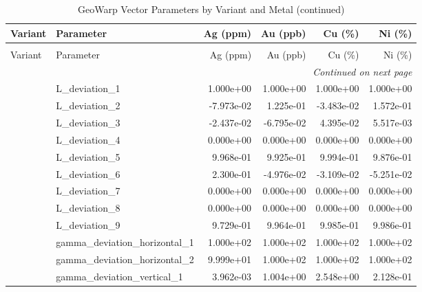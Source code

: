 
\begin{longtable}{llrrrr}
\caption{GeoWarp Vector Parameters by Variant and Metal\label{tab:gw_params}}\\
\toprule
Variant & Parameter & Ag (ppm) & Au (ppb) & Cu (\%) & Ni (\%)\\
\midrule
\endfirsthead

\caption[]{GeoWarp Vector Parameters by Variant and Metal (continued)}\\
\toprule
Variant & Parameter & Ag (ppm) & Au (ppb) & Cu (\%) & Ni (\%)\\
\midrule
\endhead

\midrule
\multicolumn{6}{r}{\textit{Continued on next page}}\\
\endfoot

\bottomrule
\endlastfoot
\multirow{46}{*}{GeoWarp DepthDeform} & L_deviation_1                  & 1.000e+00 & 1.000e+00 & 1.000e+00 & 1.000e+00\\
                               & L_deviation_2                  & -7.973e-02 & 1.225e-01 & -3.483e-02 & 1.572e-01\\
                               & L_deviation_3                  & -2.437e-02 & -6.795e-02 & 4.395e-02 & 5.517e-03\\
                               & L_deviation_4                  & 0.000e+00 & 0.000e+00 & 0.000e+00 & 0.000e+00\\
                               & L_deviation_5                  & 9.968e-01 & 9.925e-01 & 9.994e-01 & 9.876e-01\\
                               & L_deviation_6                  & 2.300e-01 & -4.976e-02 & -3.109e-02 & -5.251e-02\\
                               & L_deviation_7                  & 0.000e+00 & 0.000e+00 & 0.000e+00 & 0.000e+00\\
                               & L_deviation_8                  & 0.000e+00 & 0.000e+00 & 0.000e+00 & 0.000e+00\\
                               & L_deviation_9                  & 9.729e-01 & 9.964e-01 & 9.985e-01 & 9.986e-01\\
                               & gamma_deviation_horizontal_1   & 1.000e+02 & 1.000e+02 & 1.000e+02 & 1.000e+02\\
                               & gamma_deviation_horizontal_2   & 9.999e+01 & 1.000e+02 & 1.000e+02 & 1.000e+02\\
                               & gamma_deviation_vertical_1     & 3.962e-03 & 1.004e+00 & 2.548e+00 & 2.128e-01\\

\end{longtable}
